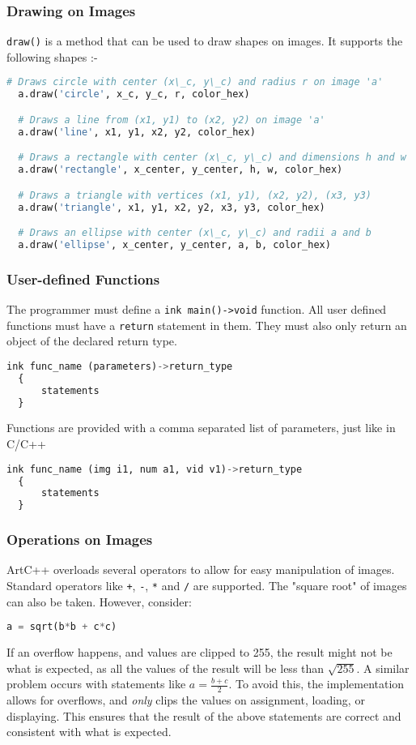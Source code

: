 \documentclass[a4paper, 11pt]{article}
\begin{document}
          \subsubsection{Drawing on Images}
             \texttt{draw()} is a method that can be used to draw shapes on images. It supports the following shapes :-
             \begin{lstlisting}[language=Python]
  # Draws circle with center (x\_c, y\_c) and radius r on image 'a'
  a.draw('circle', x_c, y_c, r, color_hex)

  # Draws a line from (x1, y1) to (x2, y2) on image 'a'
  a.draw('line', x1, y1, x2, y2, color_hex)

  # Draws a rectangle with center (x\_c, y\_c) and dimensions h and w
  a.draw('rectangle', x_center, y_center, h, w, color_hex)

  # Draws a triangle with vertices (x1, y1), (x2, y2), (x3, y3)
  a.draw('triangle', x1, y1, x2, y2, x3, y3, color_hex)

  # Draws an ellipse with center (x\_c, y\_c) and radii a and b
  a.draw('ellipse', x_center, y_center, a, b, color_hex)\end{lstlisting}

          \subsubsection{User-defined Functions}
          The programmer must define a \texttt{ink main()->void} function.
          All user defined functions must have a \texttt{return} statement in them. They must also only return an object of the declared return type.
            \begin{lstlisting}[language=Python]
  ink func_name (parameters)->return_type
  {
      statements
  }\end{lstlisting}
Functions are provided with a comma separated list of parameters, just like in C/C++
  \begin{lstlisting}[language=Python]
  ink func_name (img i1, num a1, vid v1)->return_type
  {
      statements
  }
  \end{lstlisting}

  \subsubsection{Operations on Images}
  ArtC++ overloads several operators to allow for easy manipulation of images. Standard operators like \texttt{+}, \texttt{-}, \texttt{*} and \texttt{/} are supported. The "square root" of images can also be taken. However, consider:
  \begin{lstlisting}[language=Python]
    a = sqrt(b*b + c*c)\end{lstlisting}
  If an overflow happens, and values are clipped to 255, the result might not be what is expected, as all the values of the result will be less than $\sqrt{255}$.  A similar problem occurs with statements like $a = \frac{b + c}{2}$. To avoid this,
  the implementation allows for overflows, and \textit{only} clips the values on assignment, loading, or displaying. This ensures that the result of the above statements are correct and consistent with what is expected.
\end{document}
